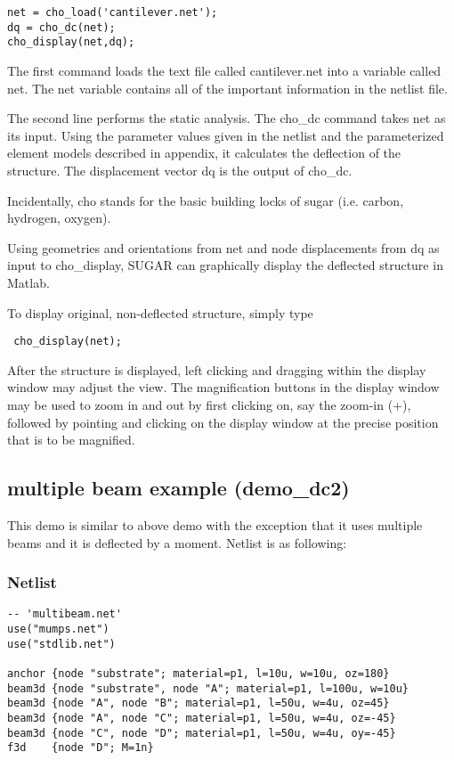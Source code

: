 \begin{verbatim}
net = cho_load('cantilever.net'); 
dq = cho_dc(net); 
cho_display(net,dq); 
\end{verbatim}

The first command loads the text file called cantilever.net into a variable
called net. The net variable contains all of the important information in the
netlist file.

The second line performs the static analysis. The cho\_dc command takes net as
its input.  Using the parameter values given in the netlist and the
parameterized element models described in appendix, it calculates the
deflection of the structure. The displacement vector dq is the output of
cho\_dc.  

 Incidentally, cho stands for the basic building locks of sugar (i.e. carbon,
hydrogen, oxygen). 

 Using geometries and orientations from net and node displacements from dq as
input to cho\_display, SUGAR can graphically display the deflected structure in
Matlab.

To display original, non-deflected structure, simply type  
\begin{verbatim}
 cho_display(net);  
\end{verbatim}
After the structure is displayed, left clicking and dragging within the
display window may adjust the view. The magnification buttons in the display
window may be used to zoom in and out by first clicking on, say the zoom-in
(+), followed by pointing and clicking on the display window at the precise
position that is to be magnified. 


\subsection{multiple beam example (demo\_dc2)}

This demo is similar to above demo with the exception that it uses multiple
beams and it is deflected by a moment. Netlist is as following: 

\subsubsection*{Netlist}

\begin{verbatim}
-- 'multibeam.net' 
use("mumps.net")
use("stdlib.net")

anchor {node "substrate"; material=p1, l=10u, w=10u, oz=180}
beam3d {node "substrate", node "A"; material=p1, l=100u, w=10u}
beam3d {node "A", node "B"; material=p1, l=50u, w=4u, oz=45}
beam3d {node "A", node "C"; material=p1, l=50u, w=4u, oz=-45}
beam3d {node "C", node "D"; material=p1, l=50u, w=4u, oy=-45}
f3d    {node "D"; M=1n}
\end{verbatim}


